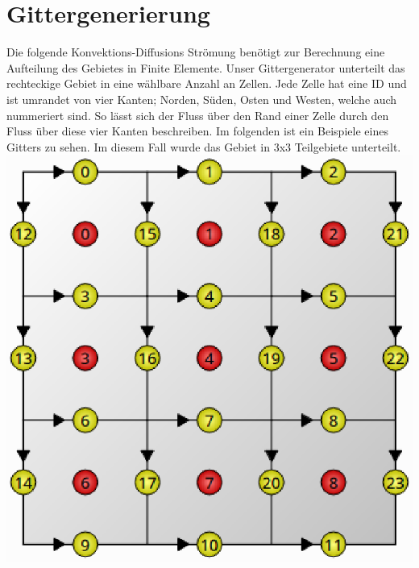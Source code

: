 \documentclass{article}
\begin{document}
\section{Gittergenerierung}
Die folgende Konvektions-Diffusions Strömung benötigt zur Berechnung eine Aufteilung des Gebietes in Finite Elemente.
Unser Gittergenerator unterteilt das rechteckige Gebiet in eine wählbare Anzahl an Zellen. Jede Zelle hat eine ID und ist 
umrandet von vier Kanten; Norden, Süden, Osten und Westen, welche auch nummeriert sind. So lässt sich der Fluss über den Rand
einer Zelle durch den Fluss über diese vier Kanten beschreiben.
Im folgenden ist ein Beispiele eines Gitters zu sehen. Im diesem Fall wurde das Gebiet in 3x3 Teilgebiete unterteilt.\\
\includegraphics[scale=0.6]{test/4grid/1.eps}
\end{document}

